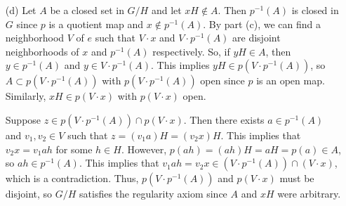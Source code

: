 \documentclass{hmwk}
\begin{document}
\begin{solution}
\begin{itemize}
    \item[(d)] Let $A$ be a closed set in $G/H$ and let $xH \notin A$. Then $p^{-1}(A)$ is closed in $G$ since $p$ is a quotient map and $x \notin p^{-1}(A)$. By part (c), we can find a neighborhood $V$ of $e$ such that $V\cdot x$ and $V \cdot p^{-1}(A)$ are disjoint neighborhoods of $x$ and $p^{-1}(A)$ respectively. So, if $yH \in A$, then $y \in p^{-1}(A)$ and $y \in V \cdot p^{-1}(A)$. This implies $yH \in p(V \cdot p^{-1}(A))$, so $A \subset p(V \cdot p^{-1}(A))$ with $p(V \cdot p^{-1}(A))$ open since $p$ is an open map. Similarly, $xH \in p(V \cdot x)$ with $p(V \cdot x)$ open. 

    \pre Suppose $z \in p(V \cdot p^{-1}(A)) \cap p(V \cdot x)$. Then there exists $a \in p^{-1}(A)$ and $v_1, v_2 \in V$ such that $z = (v_1a)H = (v_2x)H$. This implies that $v_2x = v_1ah$ for some $h \in H$. However, $p(ah) = (ah)H = aH = p(a) \in A$, so $ah \in p^{-1}(A)$. This implies that $v_1ah = v_2x \in (V \cdot p^{-1}(A)) \cap (V \cdot x)$, which is a contradiction. Thus, $p(V \cdot p^{-1}(A))$ and $p(V \cdot x)$ must be disjoint, so $G/H$ satisfies the regularity axiom since $A$ and $xH$ were arbitrary.  
    
\end{itemize}
\end{solution}
\end{document}
